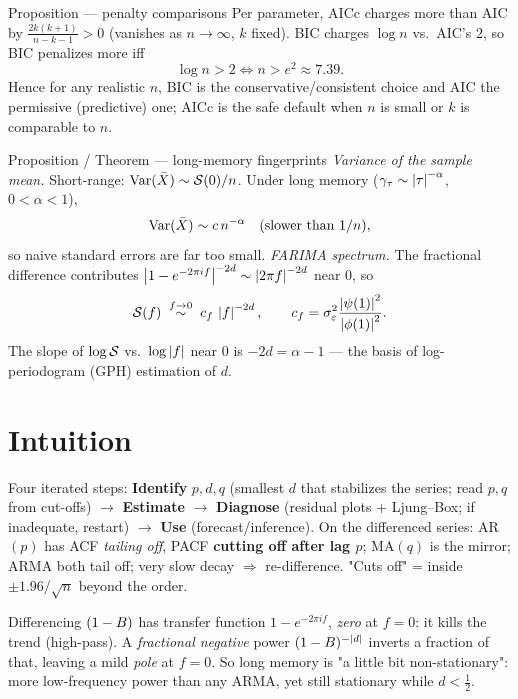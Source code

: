 \documentclass[11pt]{article}
\begin{document}
\begin{result}{Proposition --- penalty comparisons}
Per parameter, AICc charges more than AIC by $\frac{2k(k+1)}{n-k-1}>0$ (vanishes as $n\to\infty$, $k$ fixed). BIC charges $\log n$ vs.\ AIC's $2$, so BIC penalizes more iff
\[
\log n > 2 \iff n>e^2\approx 7.39.
\]
Hence for any realistic $n$, BIC is the conservative/consistent choice and AIC the permissive (predictive) one; AICc is the safe default when $n$ is small or $k$ is comparable to $n$.
\end{result}

\begin{result}{Proposition / Theorem --- long-memory fingerprints}
\emph{Variance of the sample mean.} Short-range: $\operatorname{Var}(\bar X)\sim\mathcal{S}(0)/n$. Under long memory ($\gamma_\tau\sim\left\lvert \tau \right\rvert^{-\alpha}$, $0<\alpha<1$),
\[
\operatorname{Var}(\bar X)\sim c\,n^{-\alpha}\quad(\text{slower than }1/n),
\]
so naive standard errors are far too small. \emph{FARIMA spectrum.} The fractional difference contributes $\left\lvert 1-e^{-2\pi if} \right\rvert^{-2d}\sim\left\lvert 2\pi f \right\rvert^{-2d}$ near $0$, so
\[
\mathcal{S}(f)\;\overset{f\to0}{\sim}\;c_f\,\left\lvert f \right\rvert^{-2d},\qquad c_f=\sigma_\varepsilon^2\frac{\left\lvert \psi(1) \right\rvert^2}{\left\lvert \phi(1) \right\rvert^2}.
\]
The slope of $\log\mathcal{S}$ vs.\ $\log\left\lvert f \right\rvert$ near $0$ is $-2d=\alpha-1$ --- the basis of log-periodogram (GPH) estimation of $d$.
\end{result}

\section*{Intuition}

\begin{intu}
Four iterated steps: \textbf{Identify} $p,d,q$ (smallest $d$ that stabilizes the series; read $p,q$ from cut-offs) $\to$ \textbf{Estimate} $\to$ \textbf{Diagnose} (residual plots + Ljung--Box; if inadequate, restart) $\to$ \textbf{Use} (forecast/inference). On the differenced series: AR$(p)$ has ACF \emph{tailing off}, PACF \textbf{cutting off after lag $p$}; MA$(q)$ is the mirror; ARMA both tail off; very slow decay $\Rightarrow$ re-difference. "Cuts off" = inside $\pm1.96/\sqrt n$ beyond the order.
\end{intu}

\begin{intu}
Differencing $(1-B)$ has transfer function $1-e^{-2\pi if}$, \emph{zero} at $f=0$: it kills the trend (high-pass). A \emph{fractional negative} power $(1-B)^{-|d|}$ inverts a fraction of that, leaving a mild \emph{pole} at $f=0$. So long memory is "a little bit non-stationary": more low-frequency power than any ARMA, yet still stationary while $d<\tfrac12$.
\end{intu}
\end{document}
